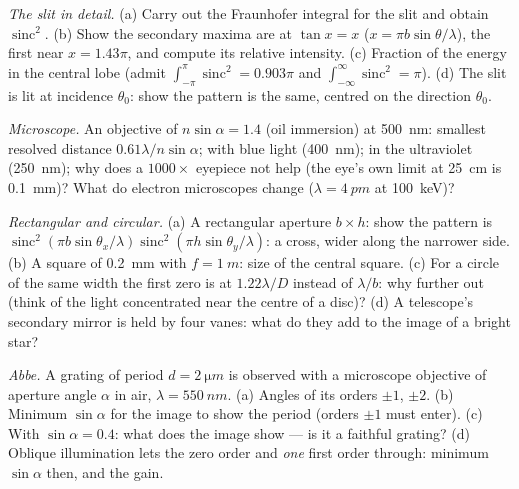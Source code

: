 \begin{exercise}[$\star\star$]\label{exo:b2:diffraction:5}
\emph{The slit in detail.} (a) Carry out the Fraunhofer integral for
the slit and obtain $\operatorname{sinc}^2$. (b) Show the secondary maxima
are at $\tan x = x$ ($x = \pi b\sin\theta/\lambda$), the first near $x = 1.43\pi$, and
compute its relative intensity. (c) Fraction of the energy in the
central lobe (admit $\int_{-\pi}^\pi\operatorname{sinc}^2 = 0.903\pi$ and
$\int_{-\infty}^\infty\operatorname{sinc}^2 = \pi$). (d) The slit is lit at incidence
$\theta_0$: show the pattern is the same, centred on the direction $\theta_0$.
\end{exercise}

\begin{exercise}[$\star\star$]\label{exo:b2:diffraction:6}
\emph{Microscope.} An objective of  $n\sin\alpha = 1.4$
(oil immersion) at \qty{500}{nm}: smallest resolved distance $0.61\lambda/n\sin
\alpha$; with blue light (\qty{400}{nm}); in the ultraviolet (\qty{250}{nm}); why
does a $1000\times$ eyepiece not help (the eye's own limit at \qty{25}{cm} is
\qty{0.1}{mm})? What do electron microscopes change ($\lambda = \qty{4}{pm}$ at
\qty{100}{keV})?
\end{exercise}

\begin{exercise}[$\star\star$]\label{exo:b2:diffraction:7}
\emph{Rectangular and circular.} (a) A rectangular aperture $b \times h$:
show the pattern is $\operatorname{sinc}^2(\pi b\sin\theta_x/\lambda)\operatorname{sinc}^2(\pi h
\sin\theta_y/\lambda)$: a cross, wider along the narrower side. (b) A square of
\qty{0.2}{mm} with $f = \qty{1}{m}$: size of the central square. (c) For a
circle of the same width the first zero is at $1.22\lambda/D$ instead of $\lambda/b$:
why further out (think of the light concentrated near the centre of a
disc)? (d) A telescope's secondary mirror is held by four vanes: what do
they add to the image of a bright star?
\end{exercise}

\begin{exercise}[$\star\star$]\label{exo:b2:diffraction:8}
\emph{Abbe.} A grating of period $d = \qty{2}{\micro m}$ is observed with a
microscope objective of aperture angle $\alpha$ in air, $\lambda = \qty{550}{nm}$.
(a) Angles of its orders $\pm1$, $\pm2$. (b) Minimum $\sin\alpha$ for the image to
show the period (orders $\pm1$ must enter). (c) With $\sin\alpha = 0.4$: what
does the image show --- is it a faithful grating? (d) Oblique
illumination lets the zero order and \emph{one} first order through:
minimum $\sin\alpha$ then, and the gain.
\end{exercise}

